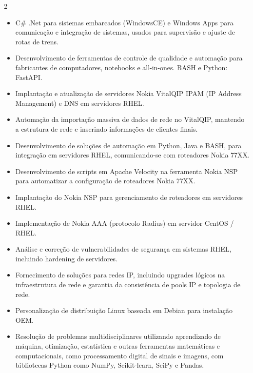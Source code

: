 \documentclass[10pt,a4paper,ragged2e,withhyper]{altacv}
\begin{document}
\begin{paracol}{2}
\begin{itemize}

    \item C\# .Net para sistemas embarcados (WindowsCE) e Windows Apps para comunicação e integração de sistemas, usados para supervisão e ajuste de rotas de trens.

    \item Desenvolvimento de ferramentas de controle de qualidade e automação para fabricantes de computadores, notebooks e all-in-ones. BASH e Python: FastAPI.
    
    \item Implantação e atualização de servidores Nokia VitalQIP IPAM (IP Address Management) e DNS em servidores RHEL.
    
    \item Automação da importação massiva de dados de rede no VitalQIP, mantendo a estrutura de rede e inserindo informações de clientes finais.
    
    \item Desenvolvimento de soluções de automação em Python, Java e BASH, para integração em servidores RHEL, comunicando-se com roteadores Nokia 77XX.
    
    \item Desenvolvimento de scripts em Apache Velocity na ferramenta Nokia NSP para automatizar a configuração de roteadores Nokia 77XX.
    
    \item Implantação do Nokia NSP para gerenciamento de roteadores em servidores RHEL.
    
    \item Implementação de Nokia AAA (protocolo Radius) em servidor CentOS / RHEL.
    
    \item Análise e correção de vulnerabilidades de segurança em sistemas RHEL, incluindo hardening de servidores.
    
    \item Fornecimento de soluções para redes IP, incluindo upgrades lógicos na infraestrutura de rede e garantia da consistência de pools IP e topologia de rede.
    
    \item Personalização de distribuição Linux baseada em Debian para instalação OEM.
    
    \item Resolução de problemas multidisciplinares utilizando aprendizado de máquina, otimização, estatística e outras ferramentas matemáticas e computacionais, como processamento digital de sinais e imagens, com bibliotecas Python como NumPy, Scikit-learn, SciPy e Pandas.
    

\end{itemize}
\end{paracol}
\end{document}
